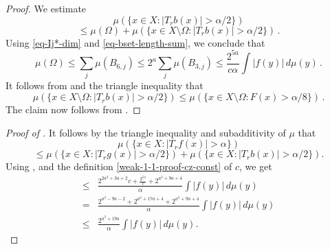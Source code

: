\begin{proof}
    \leanok
    We estimate
    \begin{equation*}
        \mu\left(\{x\in X: |T_r b(x)|>\alpha/2\}\right)
    \end{equation*}
    \begin{equation}
        \label{eq-set-dec-2}
        \le \mu (\Omega) +  \mu\left(\{x\in X\setminus\Omega: |T_r b(x)|>{\alpha}/2\}\right)\,.
    \end{equation}
    Using \eqref{eq-Ij*-dim} and \eqref{eq-bset-length-sum}, we conclude that
    \begin{equation}
        \label{eq-omega-bd}
        \mu(\Omega) \le \sum_{j} \mu (B_{6,j})
        \le 2^a \sum_j \mu(B_{3,j}) \le \frac{2^{5a}}{c\alpha} \int |f(y)|\, d\mu(y)\,.
    \end{equation}
    It follows from  and the triangle inequality that
    \begin{equation}
        \label{eq-set-dec-3}
        \mu({\{x\in X\setminus\Omega: |T_r b(x)|>\alpha/2\}}) \le \mu(\{x\in X\setminus\Omega: F(x)> \alpha/8\})\,.
    \end{equation}
    The claim now follows from .
\end{proof}

\begin{proof}[Proof of ]
\leanok
{}
It follows by the triangle inequality and subadditivity of $\mu$ that
\begin{equation*}
    \mu\left(\{x\in X: |T_r f(x)|>\alpha\}\right)
\end{equation*}
\begin{equation*}
\label{eq-set-dec-1}
 \le \mu\left(\{x\in X: |T_r g(x)|>{\alpha}/2\}\right) +  \mu\left(\{x\in X: |T_r b(x)|>{\alpha}/2\}\right).
\end{equation*}
Using ,  and the definition \eqref{weak-1-1-proof-cz-const} of $c$, we get
\begin{align*}
    \le& \frac{2^{2a^3+3a+2}c + \frac{2^{5a}}{c} + 2^{a^3+9a+4}}{\alpha} \int |f(y)|\, d\mu(y) \\
    =& \frac{2^{a^3-9a-2} + 2^{a^3+17a+4} + 2^{a^3+9a+4}}{\alpha} \int |f(y)|\, d\mu(y) \\
    \le& \frac{2^{a^3 + 19a}}{\alpha} \int |f(y)|\, d\mu(y).
\end{align*}
\end{proof}


